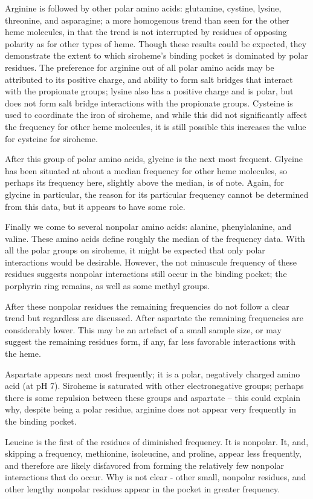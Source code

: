 \documentclass[a4paper, nobind]{templates/ociamthesis}
\begin{document}
Arginine is followed by other polar amino acids: glutamine, cystine, lysine, threonine, and asparagine; a more homogenous trend than seen for the other heme molecules, in that the trend is not interrupted by residues of opposing polarity as for other types of heme. Though these results could be expected, they demonstrate the extent to which siroheme's binding pocket is dominated by polar residues. The preference for arginine out of all polar amino acids may be attributed to its positive charge, and ability to form salt bridges that interact with the propionate groups; lysine also has a positive charge and is polar, but does not form salt bridge interactions with the propionate groups. Cysteine is used to coordinate the iron of siroheme, and while this did not significantly affect the frequency for other heme molecules, it is still possible this increases the value for cysteine for siroheme.

After this group of polar amino acids, glycine is the next most frequent. Glycine has been situated at about a median frequency for other heme molecules, so perhaps its frequency here, slightly above the median, is of note. Again, for glycine in particular, the reason for its particular frequency cannot be determined from this data, but it appears to have some role.

Finally we come to several nonpolar amino acids: alanine, phenylalanine, and valine. These amino acids define roughly the median of the frequency data. With all the polar groups on siroheme, it might be expected that only polar interactions would be desirable. However, the not minuscule frequency of these residues suggests nonpolar interactions still occur in the binding pocket; the porphyrin ring remains, as well as some methyl groups.

After these nonpolar residues the remaining frequencies do not follow a clear trend but regardless are discussed. After aspartate the remaining frequencies are considerably lower. This may be an artefact of a small sample size, or may suggest the remaining residues form, if any, far less favorable interactions with the heme.

Aspartate appears next most frequently; it is a polar, negatively charged amino acid (at pH 7). Siroheme is saturated with other electronegative groups; perhaps there is some repulsion between these groups and aspartate -- this could explain why, despite being a polar residue, arginine does not appear very frequently in the binding pocket.

Leucine is the first of the residues of diminished frequency. It is nonpolar. It, and, skipping a frequency, methionine, isoleucine, and proline, appear less frequently, and therefore are likely disfavored from forming the relatively few nonpolar interactions that do occur. Why is not clear - other small, nonpolar residues, and other lengthy nonpolar residues appear in the pocket in greater frequency.
\end{document}
